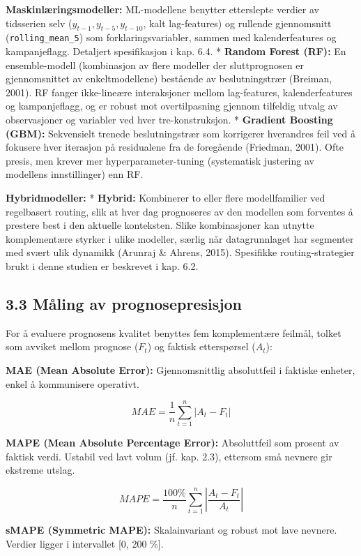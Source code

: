 \documentclass[
  norsk,
  11pt,
  a4paper,
]{article}
\begin{document}
\textbf{Maskinlæringsmodeller:} ML-modellene benytter etterslepte
verdier av tidsserien selv (\(y_{t-1}, y_{t-5}, y_{t-10}\), kalt
lag-features) og rullende gjennomsnitt (\texttt{rolling\_mean\_5}) som
forklaringsvariabler, sammen med kalenderfeatures og kampanjeflagg.
Detaljert spesifikasjon i kap. 6.4. * \textbf{Random Forest (RF):} En
ensemble-modell (kombinasjon av flere modeller der sluttprognosen er
gjennomsnittet av enkeltmodellene) bestående av beslutningstrær
(Breiman, 2001). RF fanger ikke-lineære interaksjoner mellom
lag-features, kalenderfeatures og kampanjeflagg, og er robust mot
overtilpasning gjennom tilfeldig utvalg av observasjoner og variabler
ved hver tre-konstruksjon. * \textbf{Gradient Boosting (GBM):}
Sekvensielt trenede beslutningstrær som korrigerer hverandres feil ved å
fokusere hver iterasjon på residualene fra de foregående (Friedman,
2001). Ofte presis, men krever mer hyperparameter-tuning (systematisk
justering av modellens innstillinger) enn RF.

\textbf{Hybridmodeller:} * \textbf{Hybrid:} Kombinerer to eller flere
modellfamilier ved regelbasert routing, slik at hver dag prognoseres av
den modellen som forventes å prestere best i den aktuelle konteksten.
Slike kombinasjoner kan utnytte komplementære styrker i ulike modeller,
særlig når datagrunnlaget har segmenter med svært ulik dynamikk (Arunraj
\& Ahrens, 2015). Spesifikke routing-strategier brukt i denne studien er
beskrevet i kap. 6.2.

\subsection{3.3 Måling av
prognosepresisjon}\label{muxe5ling-av-prognosepresisjon}

For å evaluere prognosens kvalitet benyttes fem komplementære feilmål,
tolket som avviket mellom prognose (\(F_t\)) og faktisk etterspørsel
(\(A_t\)):

\textbf{MAE (Mean Absolute Error):} Gjennomsnittlig absoluttfeil i
faktiske enheter, enkel å kommunisere operativt.

\[MAE = \frac{1}{n} \sum_{t=1}^{n} |A_t - F_t|\]

\textbf{MAPE (Mean Absolute Percentage Error):} Absoluttfeil som prosent
av faktisk verdi. Ustabil ved lavt volum (jf. kap. 2.3), ettersom små
nevnere gir ekstreme utslag.

\[MAPE = \frac{100\%}{n} \sum_{t=1}^{n} \left| \frac{A_t - F_t}{A_t} \right|\]

\textbf{sMAPE (Symmetric MAPE):} Skalainvariant og robust mot lave
nevnere. Verdier ligger i intervallet {[}0, 200 \%{]}.
\end{document}
